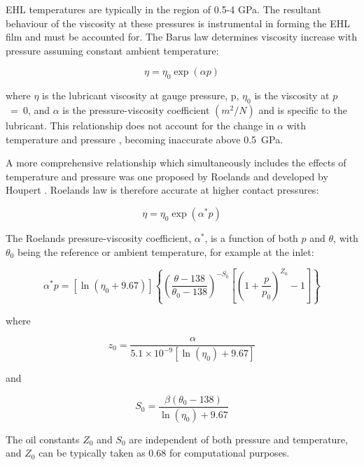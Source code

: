 EHL temperatures are typically in the region of 0.5-4 GPa. The resultant behaviour of the viscosity at these pressures is instrumental in forming the EHL film and must be accounted for. The Barus law \cite{Barus1893} determines viscosity increase with pressure assuming constant ambient temperature: 

\begin{equation}\label{eq3.24}
	\eta=\eta_0 \exp (\alpha p)
\end{equation}

where $\eta$ is the lubricant viscosity at gauge pressure, p, $\eta_0$ is the viscosity at $p$~=~0, and $\alpha$ is the pressure-viscosity coefficient $({m}^2 /{N})$ and is specific to the lubricant. This relationship does not account for the change in $\alpha$ with temperature and pressure \cite{Gohar2019}, becoming inaccurate above 0.5~GPa.

A more comprehensive relationship which simultaneously includes the effects of temperature and pressure was one proposed by Roelands \cite{Roelands1966} and developed by Houpert \cite{Houpert1984}.  Roelands law is therefore accurate at higher contact pressures:

\begin{equation}\label{eq3.25}
    \eta=\eta_0 \exp \left(\alpha^* p\right)
\end{equation}

The Roelands pressure-viscosity coefficient, $\alpha^\ast$, is a function of both $p$ and $\theta$, with $\theta_0$ being the reference or ambient temperature, for example at the inlet:

\begin{equation}\label{eq3.26}
	\alpha^* p=\left[\ln \left(\eta_0+9.67\right)\right]\left\{\left(\frac{\theta-138}{\theta_0-138}\right)^{-S_0}\left[\left(1+\frac{p}{p_0}\right)^{Z_0}-1\right]\right\}
\end{equation}

where

\begin{equation}\label{eq3.27}
	z_0=\frac{\alpha}{5.1 \times 10^{-9}\left[\ln \left(\eta_0\right)+9.67\right]}
\end{equation}

and

\begin{equation}\label{eq3.28}
	S_0=\frac{\beta\left(\theta_0-138\right)}{\ln \left(\eta_0\right)+9.67}
\end{equation}

The oil constants $Z_0$ and $S_0$ are independent of both pressure and temperature, and $Z_0$ can be typically taken as 0.68 for computational purposes.

